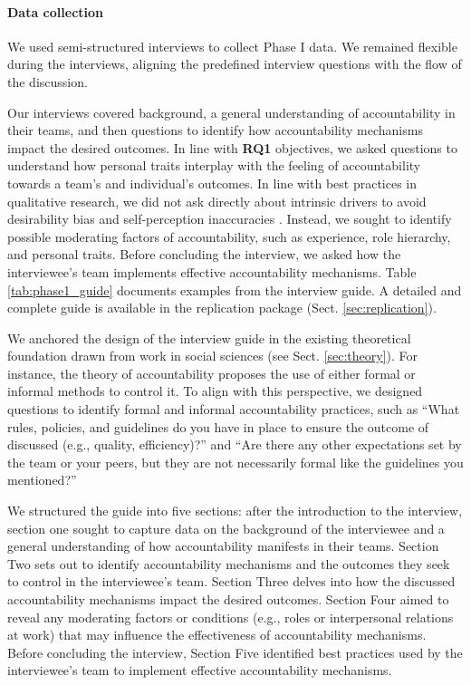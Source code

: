 \paragraph*{Data collection} We used semi-structured interviews to collect Phase I data. We remained flexible during the interviews, aligning the predefined interview questions with the flow of the discussion.

Our interviews covered background, a general understanding of accountability in their teams, and then questions to identify how accountability mechanisms impact the desired outcomes. In line with \textbf{RQ1} objectives, we asked questions to understand how personal traits interplay with the feeling of accountability towards a team's and individual's outcomes. In line with best practices in qualitative research, we did not ask directly about intrinsic drivers to avoid desirability bias and self-perception inaccuracies \citep{stone1999science,podsakoff2003common}. Instead, we sought to identify possible moderating factors of accountability, such as experience, role hierarchy, and personal traits. Before concluding the interview, we asked how the interviewee's team implements effective accountability mechanisms. Table \ref{tab:phase1_guide} documents examples from the interview guide. A detailed and complete guide is available in the replication package (Sect. \ref{sec:replication}).

We anchored the design of the interview guide in the existing theoretical foundation drawn from work in social sciences (see Sect. \ref{sec:theory}). For instance, the theory of accountability proposes the use of either formal or informal methods to control it. To align with this perspective, we designed questions to identify formal and informal accountability practices, such as ``What rules, policies, and guidelines do you have in place to ensure the outcome of discussed (e.g., quality, efficiency)?'' and ``Are there any other expectations set by the team or your peers, but they are not necessarily formal like the guidelines you mentioned?''

We structured the guide into five sections: after the introduction to the interview, section one sought to capture data on the background of the interviewee and a general understanding of how accountability manifests in their teams. Section Two sets out to identify accountability mechanisms and the outcomes they seek to control in the interviewee's team. Section Three delves into how the discussed accountability mechanisms impact the desired outcomes. Section Four aimed to reveal any moderating factors or conditions (e.g., roles or interpersonal relations at work) that may influence the effectiveness of accountability mechanisms. Before concluding the interview, Section Five identified best practices used by the interviewee's team to implement effective accountability mechanisms.


